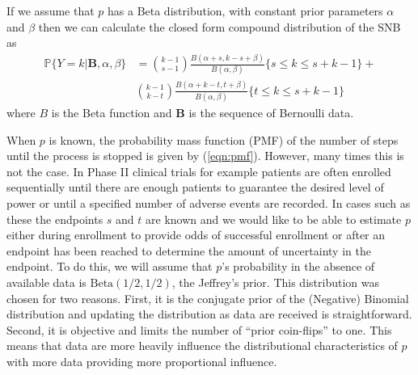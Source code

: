 \documentclass[12pt]{article}         %
\begin{document}
If we assume that $p$ has a Beta distribution, with constant prior parameters $\alpha$ and $\beta$ then we can calculate the closed form compound distribution of the SNB as
\begin{align}
\mathbb{P} \{Y = k | \mathbf{B}, \alpha, \beta \} &= {k-1 \choose s-1} \frac{B\left(\alpha+s, k-s+\beta \right)}{B(\alpha, \beta)} \{s \leq k \leq s+k-1\} + \nonumber \\
& {k-1 \choose k-t} \frac{B\left(\alpha + k - t, t+\beta\right)}{B(\alpha, \beta)} \{t \leq k \leq s+k-1\}
\end{align}
where $B$ is the Beta function and $\mathbf{B}$ is the sequence of Bernoulli data.

When $p$ is known, the probability mass function (PMF) of the number of steps until the process is stopped is given by (\ref{eqn:pmf}). However, many times this is not the case. In Phase II clinical trials for example patients are often enrolled sequentially until there are enough patients to guarantee the desired level of power or until a specified number of adverse events are recorded. In cases such as these the endpoints $s$ and $t$ are known and we would like to be able to estimate $p$ either during enrollment to provide odds of successful enrollment or after an endpoint has been reached to determine the amount of uncertainty in the endpoint. To do this, we will assume that $p$'s probability in the absence of available data is $\text{Beta}(1/2, 1/2)$, the Jeffrey's prior. This distribution was chosen for two reasons. First, it is the conjugate prior of the (Negative) Binomial distribution and updating the distribution as data are received is straightforward. Second, it is objective and limits the number of ``prior coin-flips'' to one. This means that data are more heavily influence the distributional characteristics of $p$ with more data providing more proportional influence.
\end{document}
